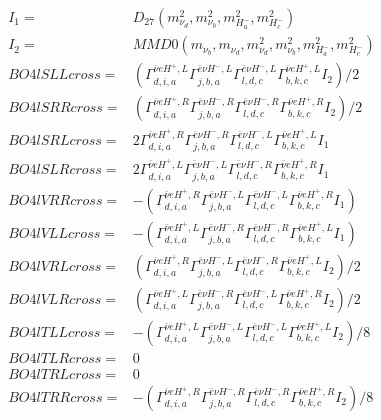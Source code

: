 \documentclass[A4,landscape]{article}
\begin{document}
\begin{align} 
I_1 = & D_{27}(m^2_{\nu_{{d}}}, m^2_{\nu_{{b}}}, m^2_{H^-_{{a}}}, m^2_{H^-_{{c}}}) \\ 
I_2 = & MMD0(m_{\nu_{{b}}}, m_{\nu_{{d}}}, m^2_{\nu_{{d}}}, m^2_{\nu_{{b}}}, m^2_{H^-_{{a}}}, m^2_{H^-_{{c}}}) \\ 
  BO4lSLLcross= & ( \Gamma^{\bar{\nu}e H^+,L}_{d, i, a} \Gamma^{\bar{e}\nu H^- ,L}_{j, b, a} \Gamma^{\bar{e}\nu H^- ,L}_{l, d, c} \Gamma^{\bar{\nu}e H^+,L}_{b, k, c} I_2)/2 \\ 
  BO4lSRRcross= & ( \Gamma^{\bar{\nu}e H^+,R}_{d, i, a} \Gamma^{\bar{e}\nu H^- ,R}_{j, b, a} \Gamma^{\bar{e}\nu H^- ,R}_{l, d, c} \Gamma^{\bar{\nu}e H^+,R}_{b, k, c} I_2)/2 \\ 
  BO4lSRLcross= & 2  \Gamma^{\bar{\nu}e H^+,R}_{d, i, a} \Gamma^{\bar{e}\nu H^- ,R}_{j, b, a} \Gamma^{\bar{e}\nu H^- ,L}_{l, d, c} \Gamma^{\bar{\nu}e H^+,L}_{b, k, c} I_1 \\ 
  BO4lSLRcross= & 2  \Gamma^{\bar{\nu}e H^+,L}_{d, i, a} \Gamma^{\bar{e}\nu H^- ,L}_{j, b, a} \Gamma^{\bar{e}\nu H^- ,R}_{l, d, c} \Gamma^{\bar{\nu}e H^+,R}_{b, k, c} I_1 \\ 
  BO4lVRRcross= & -( \Gamma^{\bar{\nu}e H^+,R}_{d, i, a} \Gamma^{\bar{e}\nu H^- ,L}_{j, b, a} \Gamma^{\bar{e}\nu H^- ,L}_{l, d, c} \Gamma^{\bar{\nu}e H^+,R}_{b, k, c} I_1) \\ 
  BO4lVLLcross= & -( \Gamma^{\bar{\nu}e H^+,L}_{d, i, a} \Gamma^{\bar{e}\nu H^- ,R}_{j, b, a} \Gamma^{\bar{e}\nu H^- ,R}_{l, d, c} \Gamma^{\bar{\nu}e H^+,L}_{b, k, c} I_1) \\ 
  BO4lVRLcross= & ( \Gamma^{\bar{\nu}e H^+,R}_{d, i, a} \Gamma^{\bar{e}\nu H^- ,L}_{j, b, a} \Gamma^{\bar{e}\nu H^- ,R}_{l, d, c} \Gamma^{\bar{\nu}e H^+,L}_{b, k, c} I_2)/2 \\ 
  BO4lVLRcross= & ( \Gamma^{\bar{\nu}e H^+,L}_{d, i, a} \Gamma^{\bar{e}\nu H^- ,R}_{j, b, a} \Gamma^{\bar{e}\nu H^- ,L}_{l, d, c} \Gamma^{\bar{\nu}e H^+,R}_{b, k, c} I_2)/2 \\ 
  BO4lTLLcross= & -( \Gamma^{\bar{\nu}e H^+,L}_{d, i, a} \Gamma^{\bar{e}\nu H^- ,L}_{j, b, a} \Gamma^{\bar{e}\nu H^- ,L}_{l, d, c} \Gamma^{\bar{\nu}e H^+,L}_{b, k, c} I_2)/8 \\ 
  BO4lTLRcross= & 0 \\ 
  BO4lTRLcross= & 0 \\ 
  BO4lTRRcross= & -( \Gamma^{\bar{\nu}e H^+,R}_{d, i, a} \Gamma^{\bar{e}\nu H^- ,R}_{j, b, a} \Gamma^{\bar{e}\nu H^- ,R}_{l, d, c} \Gamma^{\bar{\nu}e H^+,R}_{b, k, c} I_2)/8 \\ 
\end{align} 
\end{document}
